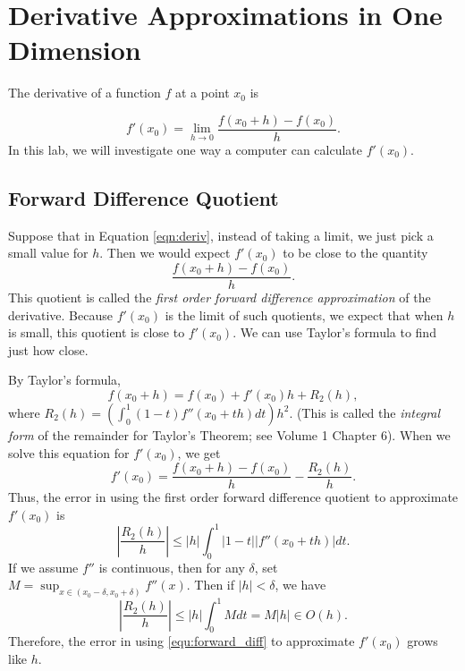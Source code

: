 \label{lab:NumericalDerivatives}

\section*{Derivative Approximations in One Dimension} %

The derivative of a function $f$ at a point $x_0$ is

\begin{equation}
\label{eqn:deriv}
f'(x_0) = \lim_{h\rightarrow 0} \frac{f(x_0 + h)-f(x_0)}{h}.
\end{equation}
%
In this lab, we will investigate one way a computer can calculate $f'(x_0)$.

\subsection*{Forward Difference Quotient} %

Suppose that in Equation \eqref{eqn:deriv}, instead of taking a limit, we just pick a small value for $h$.
Then we would expect $f'(x_0)$ to be close to the quantity
%
\begin{equation}\label{equ:forward_diff}
\frac{f(x_0 + h)-f(x_0)}{h}.
\end{equation}
%
This quotient is called the \emph{first order forward difference approximation} of the derivative.
Because $f'(x_0)$ is the limit of such quotients, we expect that when $h$ is small, this quotient is close to $f'(x_0)$.
We can use Taylor's formula to find just how close.

By Taylor's formula,
\[
f(x_0+h) = f(x_0) + f'(x_0)h + R_2(h),
\]
where $R_2(h) = \left( \int_0^1 (1-t) f''(x_0+th) dt \right) h^2$.
(This is called the \emph{integral form} of the remainder for Taylor's Theorem; see Volume 1 Chapter 6). When we solve this equation for $f'(x_0)$, we get
%
\begin{equation}\label{equ:forward_diff_with_remainder}
f'(x_0) = \frac{f(x_0+h)-f(x_0)}{h} - \frac{R_2(h)}{h}.
\end{equation}
%
Thus, the error in using the first order forward difference quotient to approximate $f'(x_0)$ is
\[
\left | \frac{R_2(h)}{h} \right | \leq |h| \int_0^1 |1 - t||f''(x_0+th)|dt.
\]
If we assume $f''$ is continuous, then for any $\delta$, set $M = \sup_{x \in (x_0-\delta, x_0+\delta)} f''(x)$. Then if $|h| < \delta$, we have
\[
\left | \frac{R_2(h)}{h} \right | \leq |h|\int_0^1 M dt = M|h|  {\in}  O(h).
\]
Therefore, the error in using \eqref{equ:forward_diff} to approximate $f'(x_0)$ grows like $h$.

